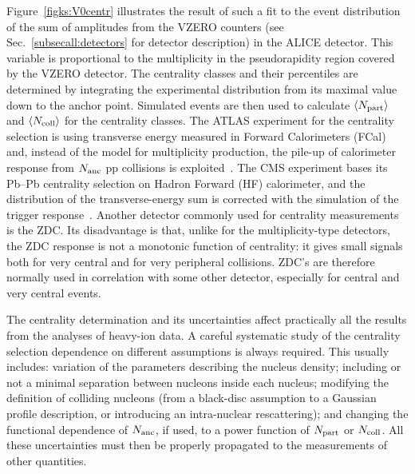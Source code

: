 Figure~\ref{figks:V0centr} illustrates the result of such a fit to the event distribution of the sum of amplitudes from the VZERO counters (see Sec.~\ref{subsecall:detectors} for detector description) in the ALICE detector. This variable is proportional to the multiplicity in the pseudorapidity region covered by the VZERO detector. The centrality classes and their percentiles are determined by integrating the experimental distribution from its maximal value down to the anchor point. Simulated events are then used to calculate $\langle N_{\rm part} \rangle$ and $\langle N_{\rm coll} \rangle$ for the centrality classes. The ATLAS experiment for the centrality selection is using transverse energy measured in Forward Calorimeters (FCal) and, instead of the model for multiplicity production, the pile-up of calorimeter response from $N_{\rm anc}$ pp collisions is exploited~\cite{ATLAS:2011ag}. The CMS experiment bases its Pb--Pb centrality selection on Hadron Forward (HF) calorimeter, and the distribution of the transverse-energy sum is corrected with the simulation of the trigger response~\cite{Chatrchyan:2011pb}. Another detector commonly used for centrality measurements is the ZDC. Its disadvantage is that, unlike for the multiplicity-type detectors, the ZDC response is not a monotonic function of centrality: it gives small signals both for very central and for very peripheral collisions. ZDC's are therefore normally used in correlation with some other detector, especially for central and very central events.

The centrality determination and its uncertainties affect practically all the results from the analyses of heavy-ion data. A careful systematic study of the centrality selection dependence on different assumptions is always required. This usually includes: variation of the parameters describing the nucleus density; including or not a minimal separation between nucleons inside each nucleus; modifying the definition of colliding nucleons (from a black-disc assumption to a Gaussian profile description, or introducing an intra-nuclear rescattering); and changing the functional dependence of $N_{\rm anc}$, if used, to a power function of $N_{\rm part}$ or $N_{\rm coll}$. All these uncertainties must then be properly propagated to the measurements of other quantities.

